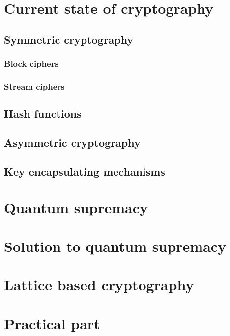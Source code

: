 \chapter{Current state of cryptography}
\label{chapt:1}


\section{Symmetric cryptography}
\label{sec:1_1}


\subsection{Block ciphers}
\label{subsec:1_1_1}


\subsection{Stream ciphers}
\label{subsec:1_1_2}



\section{Hash functions}
\label{sec:1_2}


\section{Asymmetric cryptography}
\label{sec:1_3}


\section{Key encapsulating mechanisms}
\label{sec:1_4}


\chapter{Quantum supremacy}
\label{chapt:2}


\chapter{Solution to quantum supremacy}


\chapter{Lattice based cryptography}


\chapter{Practical part}
